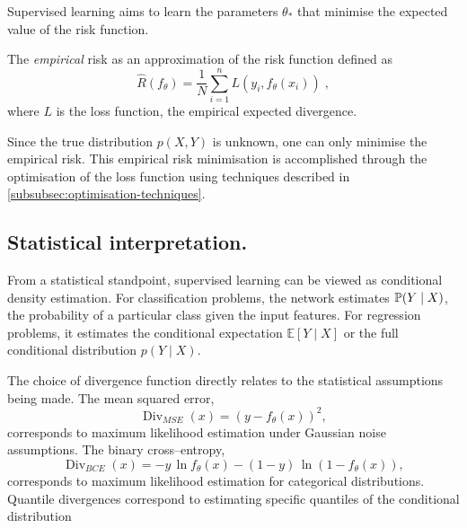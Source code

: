         Supervised learning aims to learn the parameters \(\theta_*\) that minimise the expected value of the risk function.

        \begin{definition}
            The \emph{empirical} risk as an approximation of the risk function defined as
            \begin{equation}
            \hat{{R}}(f_\theta) = \frac{1}{N}\sum_{i=1}^{n}L(y_i, f_\theta(x_i))\;,
        \end{equation}
        where \(L\) is the loss function, the empirical expected divergence.   
        \end{definition}
        
        Since the true distribution \(p(X,Y)\) is unknown, one can only minimise the empirical risk.
        This empirical risk minimisation is accomplished through the optimisation of the loss function using techniques described in \cref{subsubsec:optimisation-techniques}.
        
    \subsection{Statistical interpretation.}
    \label{subsec:supervised_learning.statistical_interpretation}
    
        From a statistical standpoint, supervised learning can be viewed as conditional density estimation.
        For classification problems, the network estimates \(\P(Y\mid X)\), the probability of a particular class given the input features.
        For regression problems, it estimates the conditional expectation \(\mathbb{E}[Y\mid X]\) or the full conditional distribution \(p(Y\mid X)\).

        The choice of divergence function directly relates to the statistical assumptions being made.
        The mean squared error, \[\operatorname{Div}_{MSE}(x) = (y - f_\theta(x))^2,\] corresponds to maximum likelihood estimation under Gaussian noise assumptions.
        The binary cross--entropy,
        \[
            \label{eq:bce}
            \operatorname{Div}_{BCE}(x) = -y\,\ln f_\theta(x) - (1-y)\,\ln(1 - f_\theta(x)),
        \] corresponds to maximum likelihood estimation for categorical distributions.
        Quantile divergences correspond to estimating specific quantiles of the conditional distribution

